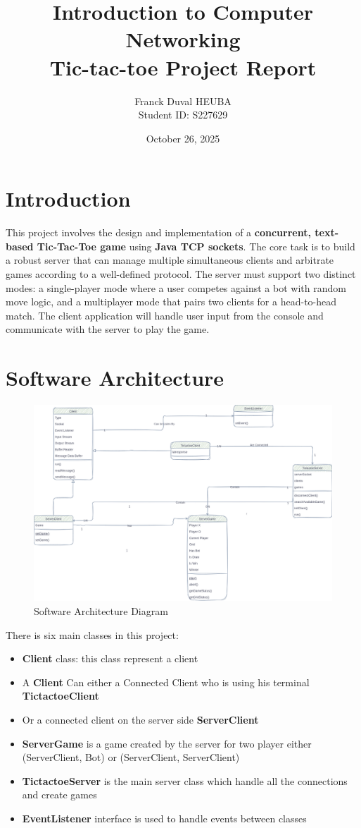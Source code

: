 \documentclass[11pt]{article}
\title{Introduction to Computer Networking\\Tic-tac-toe Project Report}
\author{Franck Duval HEUBA \\ Student ID: S227629}
\date{October 26, 2025}
\begin{document}
\maketitle

\section{Introduction}
This project involves the design and implementation of a \textbf{concurrent, text-based Tic-Tac-Toe game} using \textbf{Java TCP sockets}.
 The core task is to build a robust server that can manage multiple simultaneous clients and arbitrate games according to a well-defined 
 protocol. The server must support two distinct modes: a single-player mode where a user competes against a bot with random move logic, 
 and a multiplayer mode that pairs two clients for a head-to-head match. The client application will handle user input from the console
  and communicate with the server to play the game.

\section{Software Architecture}

\begin{figure}
    \centering
    \includegraphics[width=1\textwidth]{./images/project-1.drawio.png}
    \caption{Software Architecture Diagram}
\end{figure}

There is six main classes in this project:
\begin{itemize}
    \item \textbf{Client} class: this class represent a client 
    \item A \textbf{Client} Can either a Connected Client who is using his terminal \textbf{TictactoeClient}
    \item Or a connected client on the server side \textbf{ServerClient}
    \item \textbf{ServerGame} is a game created by the server for two player either (ServerClient, Bot) or (ServerClient, ServerClient)
    \item \textbf{TictactoeServer} is the main server class which handle all the connections and create games
    \item \textbf{EventListener} interface is used to handle events between classes
\end{itemize}
\end{document}
